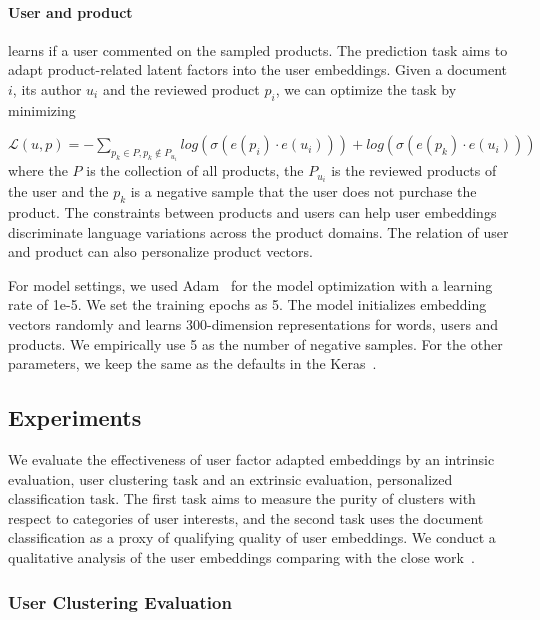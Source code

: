 \paragraph{User and product}
learns if a user commented on the sampled products. The prediction task aims to adapt product-related latent factors into the user embeddings.
Given a document $i$, its author $u_i$ and the reviewed product $p_i$,
we can optimize the task by minimizing

$\mathcal{L}(u, p) = -\sum_{p_k \in P, p_k \notin P_{u_i}}log(\sigma(e(p_i) \cdot e(u_i))) + log(\sigma(e(p_k) \cdot e(u_i)))$
where the $P$ is the collection of all products, the $P_{u_i}$ is the reviewed products of the user and the $p_k$ is a negative sample that the user does not purchase the product.
The constraints between products and users can help user embeddings discriminate language variations across the product domains.
The relation of user and product can also personalize product vectors.

For model settings, we used Adam~\cite{kingma2014adam} for the model optimization with a learning rate of 1e-5. We set the training epochs as 5. The model initializes embedding vectors randomly and learns 300-dimension representations for words, users and products. We empirically use 5 as the number of negative samples. For the other parameters, we keep the same as the defaults in the Keras~\cite{chollet2015keras}. 


\subsection{Experiments}
\label{chap4:subsec:exp2}

We evaluate the effectiveness of user factor adapted embeddings by an intrinsic evaluation, user clustering task and an extrinsic evaluation, personalized classification task. The first task aims to measure the purity of clusters with respect to categories of user interests, and the second task uses the document classification as a proxy of qualifying quality of user embeddings. We conduct a qualitative analysis of the user embeddings comparing with the close work~\cite{amir2017quantifying}.


\subsubsection{User Clustering Evaluation}

